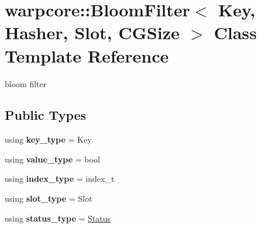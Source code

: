 \hypertarget{classwarpcore_1_1BloomFilter}{}\section{warpcore\+:\+:Bloom\+Filter$<$ Key, Hasher, Slot, C\+G\+Size $>$ Class Template Reference}
\label{classwarpcore_1_1BloomFilter}


bloom filter  


\subsection*{Public Types}
\begin{DoxyCompactItemize}
\item 
\mbox{\label{classwarpcore_1_1BloomFilter_ae33a034a8dfe87aba6e92af1a210d943}} 
using {\bfseries key\+\_\+type} = Key
\item 
\mbox{\label{classwarpcore_1_1BloomFilter_a9eb144015fa06a5b481f9f5a872662af}} 
using {\bfseries value\+\_\+type} = bool
\item 
\mbox{\label{classwarpcore_1_1BloomFilter_a95a1a6802d0de2f792372f81a0534bc4}} 
using {\bfseries index\+\_\+type} = index\+\_\+t
\item 
\mbox{\label{classwarpcore_1_1BloomFilter_a0f472c61b84dd8e07309064bdb8a8bdd}} 
using {\bfseries slot\+\_\+type} = Slot
\item 
\mbox{\label{classwarpcore_1_1BloomFilter_a6341f8816b7384983431a2229f28385f}} 
using {\bfseries status\+\_\+type} = \hyperlink{classwarpcore_1_1Status}{Status}
\end{DoxyCompactItemize}
